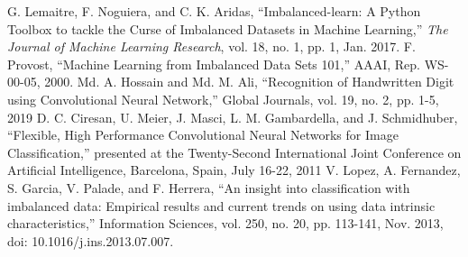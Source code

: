 \documentclass[Dealing with Imbalance in Computer Vision]{IEEEtran}
\begin{document}
\begin{thebibliography}{00}
 G. Lemaitre, F. Noguiera, and C. K. Aridas, ``Imbalanced-learn: A Python Toolbox to tackle the Curse of Imbalanced Datasets in Machine Learning,'' \emph{The Journal of Machine Learning Research}, vol. 18, no. 1, pp. 1, Jan. 2017.
 F. Provost, ``Machine Learning from Imbalanced Data Sets 101,'' AAAI, Rep. WS-00-05, 2000.
 Md. A. Hossain and Md. M. Ali, ``Recognition of Handwritten Digit using Convolutional Neural Network,'' Global Journals, vol. 19, no. 2, pp. 1-5, 2019
 D. C. Ciresan, U. Meier, J. Masci, L. M. Gambardella, and J. Schmidhuber, ``Flexible, High Performance Convolutional Neural Networks for Image Classification,'' presented at the Twenty-Second International Joint Conference on Artificial Intelligence, Barcelona, Spain, July 16-22, 2011
 V. Lopez, A. Fernandez, S. Garcia, V. Palade, and F. Herrera, ``An insight into classification with imbalanced data: Empirical results and current trends on using data intrinsic characteristics,'' Information Sciences, vol. 250, no. 20, pp. 113-141, Nov. 2013, doi: 10.1016/j.ins.2013.07.007.

\end{thebibliography}
\vspace{12pt}
\end{document}
